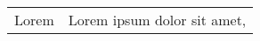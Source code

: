 \documentclass{article}
\begin{document}
\begin{tabular}{l|p{5cm}}
Lorem
&
Lorem ipsum dolor sit amet,
\\

\end{tabular}
\end{document}
